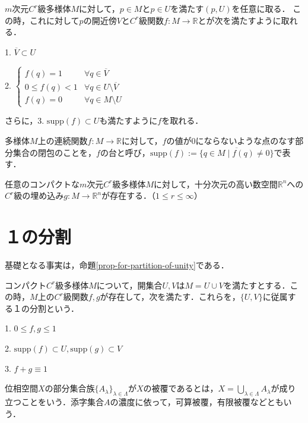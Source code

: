 \documentclass[uplatex, dvipdfmx]{jsreport}
\begin{document}
\begin{proposition}\label{prop-for-partition-of-unity}
    $m$次元$C^r$級多様体$M$に対して，$p\in M$と$p\in U$を満たす$(p,U)$を任意に取る．
    この時，これに対して$p$の開近傍$V$と$C^r$級関数$f:M\to\mathbb{R}$とが次を満たすように取れる．

    1. $\overline{V}\subset U$

    2. $\begin{cases}
        f(q)=1 & \forall q\in\overline{V} \\
        0\le f(q)<1 & \forall q\in U\setminus \overline{V} \\
        f(q)=0 & \forall q\in M\setminus U
    \end{cases}$
\end{proposition}
\begin{remark*}
    さらに，3. $\mathrm{supp}(f)\subset U$も満たすように$f$を取れる．
\end{remark*}

\begin{definition}
    多様体$M$上の連続関数$f:M\to\mathbb{R}$に対して，$f$の値が$0$にならないような点のなす部分集合の閉包のことを，$f$の台と呼び，$\mathrm{supp}(f):=\overline{\{ q\in M\mid f(q)\ne 0 \}}$で表す．
\end{definition}

\begin{proposition}[埋め込み定理]
    任意のコンパクトな$m$次元$C^r$級多様体$M$に対して，十分次元の高い数空間$\mathbb{R}^n$への$C^r$級の埋め込み$g:M\to\mathbb{R}^n$が存在する．（$1\le r\le\infty$）
\end{proposition}

\chapter{１の分割}
基礎となる事実は，命題\ref{prop-for-partition-of-unity}である．

\begin{theorem}[1の分割：$n=2$の時．]
    コンパクト$C^r$級多様体$M$について，開集合$U,V$は$M=U\cup V$を満たすとする．この時，$M$上の$C^r$級関数$f,g$が存在して，次を満たす．これらを，$\{U,V\}$に従属する１の分割という．

    1. $0\le f,g\le 1$

    2. $\mathrm{supp}(f)\subset U, \mathrm{supp}(g)\subset V$

    3. $f+g\equiv 1$
\end{theorem}

\begin{definition}[covering]
    位相空間$X$の部分集合族$\{A_\lambda\}_{\lambda\in\Lambda}$が$X$の被覆であるとは，$X=\bigcup_{\lambda\in\Lambda}A_\lambda$が成り立つことをいう．添字集合$A$の濃度に依って，可算被覆，有限被覆などともいう．
\end{definition}
\end{document}
